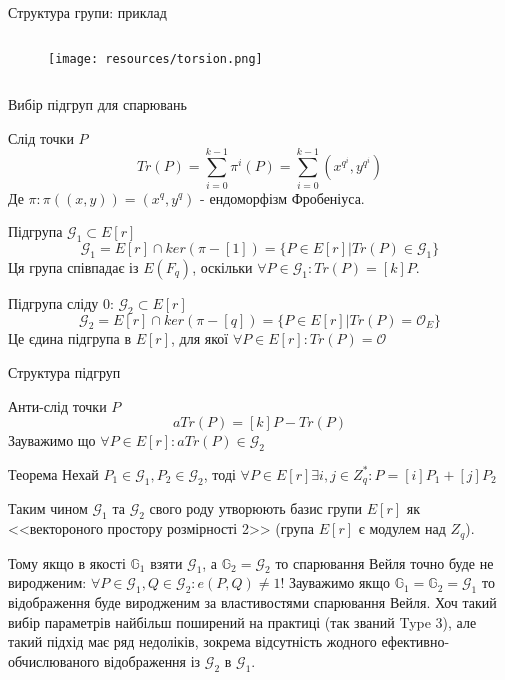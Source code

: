 \documentclass[9pt]{beamer}
\begin{document}
\begin{darkframes}
\begin{frame}{Структура групи: приклад}
\begin{columns}
        \begin{column}{0.5\textwidth}
            \begin{figure}
        \centering
        \texttt{[image: resources/torsion.png]}
        \label{fig:enter-label}
    \end{figure}
        \end{column}
        \end{columns}
\end{frame}
\begin{frame}{Вибір підгруп для спарювань}
\begin{block}{Слід точки $P$}
    $$Tr(P) = \sum_{i=0}^{k-1} \pi^{i} (P) = \sum_{i=0}^{k-1}(x^{q^i},y^{q^i})$$ 
    Де $\pi:\pi((x,y))=(x^q,y^q)$ - ендоморфізм Фробеніуса.
\end{block}
\begin{block}{Підгрупа $\mathcal{G}_1 \subset E[r]$}
    $$\mathcal{G}_1 = E[r] \cap ker(\pi - [1])= \{ P \in E[r] | Tr(P) \in \mathcal{G}_1 \}$$
    Ця група співпадає із $E(F_q)$, оскільки $\forall P \in \mathcal{G}_1: Tr(P) = [k]P$.
\end{block}

\begin{block}{Підгрупа сліду 0: $\mathcal{G}_2 \subset E[r]$}
    $$\mathcal{G}_2 = E[r] \cap ker(\pi - [q])= \{ P \in E[r] | Tr(P) = \mathcal{O}_E \} $$
    Це єдина підгрупа в $E[r]$, для якої $\forall P \in E[r]: Tr(P)=\mathcal{O}$
\end{block}

\end{frame}

\begin{frame}{Структура підгруп}
    \begin{block}{Анти-слід точки $P$}
        $$aTr(P) = [k]P - Tr(P)$$
        Зауважимо що $\forall P \in E[r]:aTr(P) \in \mathcal{G}_2$
    \end{block}
    \begin{block}{Теорема}
        Нехай $P_1 \in \mathcal{G}_1, P_2 \in \mathcal{G}_2$, тоді $\forall P \in E[r] \exists i,j \in Z_q^*: P=[i]P_1 +[j]P_2$
    \end{block}
    Таким чином $\mathcal{G}_1$ та $\mathcal{G}_2$ свого роду утворюють базис групи $E[r]$ як <<вектороного простору розмірності 2>> (група $E[r]$ є модулем над $Z_q$).

    Тому якщо в якості $\mathbb{G}_1$ взяти $\mathcal{G}_1$, а $\mathbb{G}_2 = \mathcal{G}_2$ то спарювання Вейля точно буде не виродженим: $\forall P \in \mathcal{G}_1,Q \in \mathcal{G}_2: e(P,Q) \neq 1$! Зауважимо якщо $\mathbb{G}_1 =\mathbb{G}_2 = \mathcal{G}_1$ то відображення буде виродженим за властивостями спарювання Вейля. Хоч такий вибір параметрів найбільш поширений на практиці (так званий Type 3), але такий підхід має ряд недоліків, зокрема відсутність жодного ефективно-обчислюваного відображення із $\mathcal{G}_2$ в $\mathcal{G}_1$.
\end{frame}


\end{darkframes}
\end{document}
